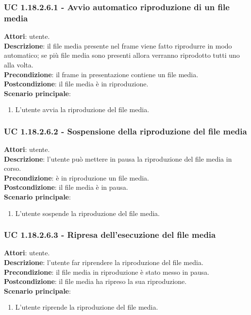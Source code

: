 	\subsubsection{UC 1.18.2.6.1 - Avvio automatico riproduzione di un file media}{
		\label{uc1.18.2.6.1}
		\textbf{Attori}: utente. \\
		\textbf{Descrizione}: il file media presente nel frame viene fatto riprodurre in modo automatico; se più file media sono presenti allora verranno riprodotto tutti uno alla volta. \\
		\textbf{Precondizione}: il frame in presentazione contiene un file media.	\\
		\textbf{Postcondizione}: il file media è in riproduzione.\\
		\textbf{Scenario principale}:
		\begin{enumerate}
			\item L'utente avvia la riproduzione del file media.
		\end{enumerate}				
	}
	\subsubsection{UC 1.18.2.6.2 - Sospensione della riproduzione del file media}{
		\label{uc1.18.2.6.2}
		\textbf{Attori}: utente. \\
		\textbf{Descrizione}: l'utente può mettere in pausa la riproduzione del file media in corso. \\
		\textbf{Precondizione}: è in riproduzione un file media.	\\
		\textbf{Postcondizione}: il file media è in pausa.\\
		\textbf{Scenario principale}:
		\begin{enumerate}
			\item L'utente sospende la riproduzione del file media.
		\end{enumerate}				
	}
	\subsubsection{UC 1.18.2.6.3 - Ripresa dell'esecuzione del file media}{
		\label{uc1.18.2.6.3}
		\textbf{Attori}: utente. \\
		\textbf{Descrizione}: l'utente far riprendere la riproduzione del file media. \\
		\textbf{Precondizione}: il file media in riproduzione è stato messo in pausa.	\\
		\textbf{Postcondizione}: il file media ha ripreso la sua riproduzione.\\
		\textbf{Scenario principale}:
		\begin{enumerate}
			\item L'utente riprende la riproduzione del file media.
		\end{enumerate}				
	}
